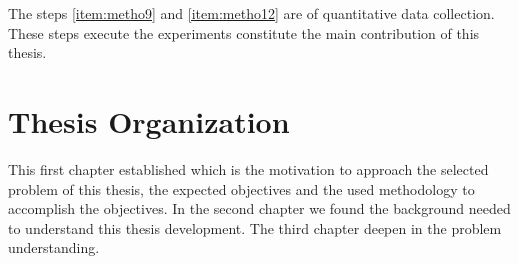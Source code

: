 The steps \ref{item:metho9} and \ref{item:metho12} are of quantitative data collection. These steps execute the experiments constitute the main contribution of this thesis. 


\section{Thesis Organization}
 This first chapter established which is the motivation to approach the selected problem of this thesis, the expected objectives and the used methodology to accomplish the objectives. In the second chapter we found the background needed to understand this thesis development. The third chapter deepen in the problem understanding. 
 
